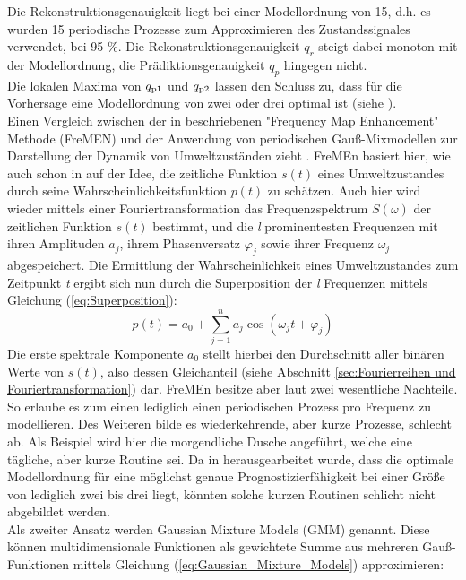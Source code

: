 Die Rekonstruktionsgenauigkeit liegt bei einer Modellordnung von 15, d.h. es wurden 15 periodische Prozesse zum Approximieren des Zustandssignales verwendet, bei 95 \%. Die Rekonstruktionsgenauigkeit $q_r$ steigt dabei monoton mit der Modellordnung, die Prädiktionsgenauigkeit $q_p$ hingegen nicht. 
\\
Die lokalen Maxima von $q_{\mathrm{p1}}$ und $q_{\mathrm{p2}}$ lassen den Schluss zu, dass für die Vorhersage eine Modellordnung von zwei oder drei optimal ist (siehe ). \\
Einen Vergleich zwischen der in \cite{Krajnik.2014} beschriebenen "Frequency Map Enhancement" Methode (FreMEN) und der Anwendung von periodischen Gauß-Mixmodellen zur Darstellung der Dynamik von Umweltzuständen zieht \cite{Krajnik.2015b}. FreMEn basiert hier, wie auch schon in \cite{Krajnik.2014} auf der Idee, die zeitliche Funktion $s(t)$ eines Umweltzustandes durch seine Wahrscheinlichkeitsfunktion $p(t)$ zu schätzen. Auch hier wird wieder mittels einer Fouriertransformation das Frequenzspektrum $S(\omega)$ der zeitlichen Funktion $s(t)$ bestimmt, und die \textit{l} prominentesten Frequenzen mit ihren Amplituden $a_j$, ihrem Phasenversatz $\varphi_j$ sowie ihrer Frequenz $\omega_j$ abgespeichert. Die Ermittlung der Wahrscheinlichkeit eines Umweltzustandes zum Zeitpunkt \textit{t} ergibt sich nun durch die Superposition der \textit{l} Frequenzen mittels Gleichung (\ref{eq:Superposition}):
\begin{equation}
	p(t) = a_0 + \sum_{j=1}^{n} a_j \cos(\omega_j t + \varphi_j)
	\label{eq:Superposition}
\end{equation}
Die erste spektrale Komponente $a_0$ stellt hierbei den Durchschnitt aller binären Werte von $s(t)$, also dessen Gleichanteil (siehe Abschnitt \ref{sec:Fourierreihen und Fouriertransformation}) dar. FreMEn besitze aber laut \cite{Krajnik.2015b} zwei wesentliche Nachteile. So erlaube es zum einen lediglich einen periodischen Prozess pro Frequenz zu modellieren. Des Weiteren bilde es wiederkehrende, aber kurze Prozesse, schlecht ab. Als Beispiel wird hier die morgendliche Dusche angeführt, welche eine tägliche, aber kurze Routine sei. Da in \cite{Krajnik.2014} herausgearbeitet wurde, dass die optimale Modellordnung für eine möglichst genaue Prognostizierfähigkeit bei einer Größe von lediglich zwei bis drei liegt, könnten solche kurzen Routinen schlicht nicht abgebildet werden. \\ Als zweiter Ansatz werden Gaussian Mixture Models (GMM) genannt. Diese können multidimensionale Funktionen als gewichtete Summe aus mehreren Gauß-Funktionen mittels Gleichung (\ref{eq:Gaussian_Mixture_Models}) approximieren:
